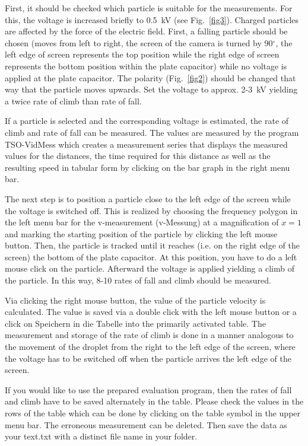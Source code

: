 \documentclass{tudphygp_eng}
\begin{document}
First, it should be checked which particle is suitable for the measurements. For this, the voltage is increased briefly to 0.5~kV (see Fig.~\ref{fig3}). Charged particles are affected by the force of the electric field. First, a falling particle should be chosen (moves from left to right, the screen of the camera is turned by 90${^\circ}$, the left edge of screen represents the top position while the right edge of screen represents the bottom position within the plate capacitor) while no voltage is applied at the plate capacitor. The polarity (Fig.~\ref{fig2}) should be changed that way that the particle moves upwards. Set the voltage to approx. 2-3~kV yielding a twice rate of climb than rate of fall.

If a particle is selected and the corresponding voltage is estimated, the rate of climb and rate of fall can be measured. The values are measured by the program TSO-VidMess which creates a measurement series that displays the measured values for the distances, the time required for this distance as well as the resulting speed in tabular form by clicking on the bar graph in the right menu bar.

The next step is to position a particle close to the left edge of the screen while the voltage is switched off. This is realized by choosing the frequency polygon in the left menu bar for the v-measurement (\grqq{}v-Messung\grqq{}) at a magnification of $x=1$ and marking the starting position of the particle by clicking the left mouse button. Then, the particle is tracked until it reaches (i.e. on the right edge of the screen) the bottom of the plate capacitor. At this position, you have to do a left mouse click on the particle. Afterward the voltage is applied yielding a climb of the particle. In this way, 8-10 rates of fall and climb should be measured.

Via clicking the right mouse button, the value of the particle velocity is calculated. The value is saved via a double click with the left mouse button or a click on \grqq{}Speichern in die Tabelle\grqq{} into the primarily activated table. The measurement and storage of the rate of climb is done in a manner analogous to the movement of the droplet from the right to the left edge of the screen, where the voltage has to be switched off when the particle arrives the left edge of the screen.

If you would like to use the prepared evaluation program, then the rates of fall and climb have to be saved alternately in the table. Please check the values in the rows of the table which can be done by clicking on the table symbol in the upper menu bar. The erroneous measurement can be deleted. Then save the data as \grqq{}your text.txt\grqq{} with a distinct file name in your folder.
\end{document}
